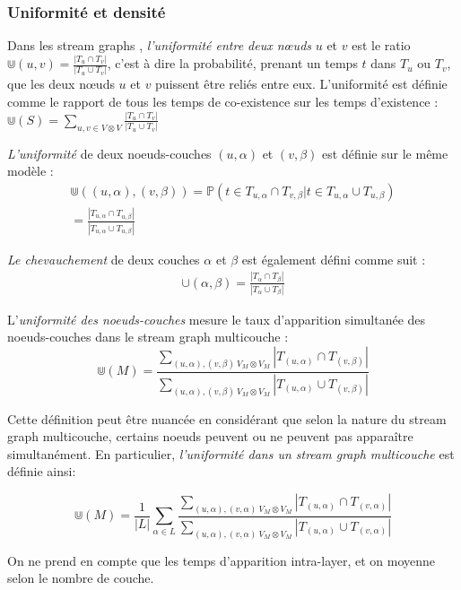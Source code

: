 \documentclass[11pt,a4paper]{article}
\theoremstyle{definition}
\theoremstyle{remark}
\theoremstyle{remark}
\def \stgm {stream graph multicouche}
\def \stgs {stream graphs}
\begin{document}
	


	\subsubsection{Uniformité et densité}
	
	Dans les \stgs{} \cite{stream}, {\em l'uniformité entre deux nœuds} $u$ et $v$ est le ratio $\Cup (u,v) = \frac{|T_u\cap T_v|}{|T_u \cup T_v|}$, c'est à dire la probabilité, prenant un temps $t$ dans $T_u$ ou $T_v$, que les deux nœuds $u$ et $v$ puissent être reliés entre eux. L'uniformité est définie comme le rapport de tous les temps de co-existence sur les temps d'existence : $
 \Cup(S)=\sum_{u,v \in V \otimes V}\frac{|T_u\cap T_v|}{|T_u\cup T_v|}
$
	
		
	{\em L'uniformité } de deux noeuds-couches $(u,\alpha)$ et $(v,\beta)$ est définie sur le même modèle :
	\begin{align*}
		\Cup((u,\alpha),(v,\beta))=\mathbb{P}( t \in T_{u,\alpha} \cap T_{v,\beta} | t \in T_{u,\alpha} \cup T_{u,\beta}) \\
		= \frac{|T_{u,\alpha}\cap T_{u,\beta}|}{|T_{u,\alpha}\cup T_{u,\beta}|}
	\end{align*}

	{\em Le chevauchement} de deux couches $\alpha$ et $\beta$ est également défini comme suit :
	\begin{align*}
		\cup(\alpha,\beta) = \frac{|T_{\alpha}\cap T_{\beta}|}{|T_{\alpha}\cup T_{\beta}|}
	\end{align*}

    L'{\em uniformité des noeuds-couches} mesure le taux d'apparition simultanée des noeuds-couches dans le \stgm{} :
    \[
    	\Cup(M) = \frac{\sum_{(u,\alpha),(v,\beta) \ V_M \otimes V_M}{|T_{(u,\alpha)} \cap T_{(v,\beta)}|}}{\sum_{(u,\alpha),(v,\beta) \ V_M \otimes V_M}{|T_{(u,\alpha)}\cup T_{(v,\beta)}|}}
    \]
	
	Cette définition peut être nuancée en considérant que selon la nature du \stgm{}, certains noeuds peuvent ou ne peuvent pas apparaître simultanément. En particulier, {\em l'uniformité dans un \stgm{}} est définie ainsi:	
	
	\[
    	\Cup(M) = \frac{1}{|L|}\sum_{\alpha \in L} \frac{\sum_{(u,\alpha),(v,\alpha) \ V_M \otimes V_M}{|T_{(u,\alpha)} \cap T_{(v,\alpha)}|}}{\sum_{(u,\alpha),(v,\alpha) \ V_M \otimes V_M}{|T_{(u,\alpha)}\cup T_{(v,\alpha)}|}}
    \]
    
    On ne prend en compte que les temps d'apparition intra-layer, et on moyenne selon le nombre de couche. 
\end{document}
